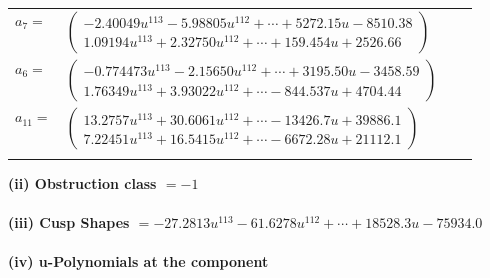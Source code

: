 \documentclass[1p]{elsarticle_modified}
\theoremstyle{definition}
\begin{document}
\begin{tabular}{m{7pt} m{180pt} m{7pt} m{180pt} }
\flushright $a_{7}=$&$\begin{pmatrix}-2.40049 u^{113}-5.98805 u^{112}+\cdots+5272.15 u-8510.38\\1.09194 u^{113}+2.32750 u^{112}+\cdots+159.454 u+2526.66\end{pmatrix}$ \\
\flushright $a_{6}=$&$\begin{pmatrix}-0.774473 u^{113}-2.15650 u^{112}+\cdots+3195.50 u-3458.59\\1.76349 u^{113}+3.93022 u^{112}+\cdots-844.537 u+4704.44\end{pmatrix}$ \\
\flushright $a_{11}=$&$\begin{pmatrix}13.2757 u^{113}+30.6061 u^{112}+\cdots-13426.7 u+39886.1\\7.22451 u^{113}+16.5415 u^{112}+\cdots-6672.28 u+21112.1\end{pmatrix}$\\&\end{tabular}
\flushleft \textbf{(ii) Obstruction class $= -1$}\\~\\
\flushleft \textbf{(iii) Cusp Shapes $= -27.2813 u^{113}-61.6278 u^{112}+\cdots+18528.3 u-75934.0$}\\~\\
\newpage\renewcommand{\arraystretch}{1}
\flushleft \textbf{(iv) u-Polynomials at the component}\newline \\
\end{document}
